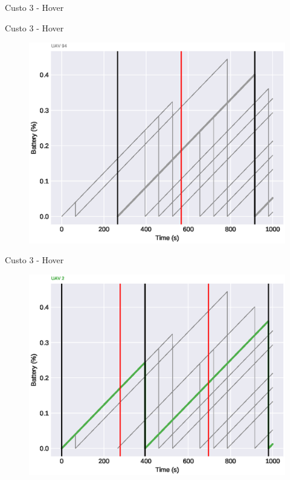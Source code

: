 \begin{frame}{Custo 3 - Hover}
            \end{frame}\begin{frame}{Custo 3 - Hover}
                \begin{figure}[!htb]
                     \includegraphics[width=\textwidth]{custo_3/uav_hover_acum_uav_8.eps}
                 \end{figure}
            \end{frame}\begin{frame}{Custo 3 - Hover}
                \begin{figure}[!htb]
                     \includegraphics[width=\textwidth]{custo_3/uav_hover_acum_uav_2.eps}

\end{figure}
\end{frame}

